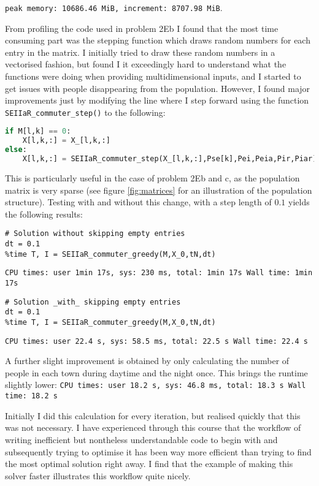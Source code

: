 \texttt{\small peak memory: 10686.46 MiB, increment: 8707.98 MiB}.

From profiling the code used in problem 2Eb I found that the most time consuming part was the stepping function which draws random numbers for each entry in the matrix. I initially tried to draw these random numbers in a vectorised fashion, but found I it exceedingly hard to understand what the functions were doing when providing multidimensional inputs, and I started to get issues with people disappearing from the population. However, I found major improvements just by modifying the line where I step forward using the function \lstinline|SEIIaR_commuter_step()| to the following:
\begin{lstlisting}[language=Python]
if M[l,k] == 0:
    X[l,k,:] = X_[l,k,:]
else:
    X[l,k,:] = SEIIaR_commuter_step(X_[l,k,:],Pse[k],Pei,Peia,Pir,Piar)
\end{lstlisting} 

This is particularly useful in the case of problem 2Eb and c, as the population matrix is very sparse (see figure \ref{fig:matrices} for an illustration of the population structure). Testing with and without this change, with a step length of $0.1$ yields the following results:
\begin{lstlisting}
# Solution without skipping empty entries
dt = 0.1
%time T, I = SEIIaR_commuter_greedy(M,X_0,tN,dt)
\end{lstlisting}
\texttt{\small CPU times: user 1min 17s, sys: 230 ms, total: 1min 17s
Wall time: 1min 17s}
\begin{lstlisting}
# Solution _with_ skipping empty entries
dt = 0.1
%time T, I = SEIIaR_commuter_greedy(M,X_0,tN,dt)
\end{lstlisting}
\texttt{\small CPU times: user 22.4 s, sys: 58.5 ms, total: 22.5 s
Wall time: 22.4 s}

A further slight improvement is obtained by only calculating the number of people in each town during daytime and the night once. This brings the runtime slightly lower:
\texttt{\small CPU times: user 18.2 s, sys: 46.8 ms, total: 18.3 s
Wall time: 18.2 s
}

Initially I did this calculation for every iteration, but realised quickly that this was not necessary. I have experienced through this course that the workflow of writing inefficient but nontheless understandable code to begin with and subsequently trying to optimise it has been way more efficient than trying to find the most optimal solution right away. I find that the example of making this solver faster illustrates this workflow quite nicely.
 

